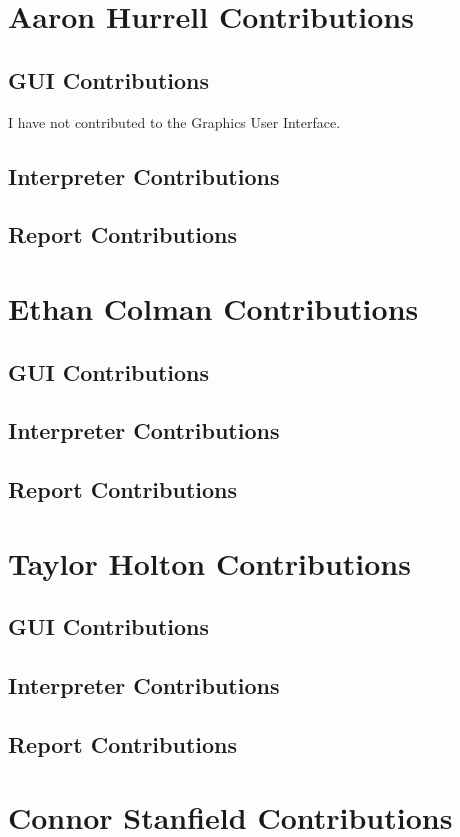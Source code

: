 \documentclass[a4paper, oneside, 11pt]{report}
\begin{document}
\section{Aaron Hurrell Contributions}
\subsection{GUI Contributions}
I have not contributed to the Graphics User Interface.
\subsection{Interpreter Contributions}
\subsection{Report Contributions}

\section{Ethan Colman Contributions}
\subsection{GUI Contributions}
\subsection{Interpreter Contributions}
\subsection{Report Contributions}

\section{Taylor Holton Contributions}
\subsection{GUI Contributions}
\subsection{Interpreter Contributions}
\subsection{Report Contributions}

\section{Connor Stanfield Contributions}
\end{document}

